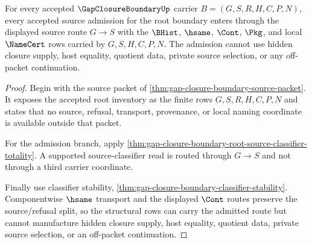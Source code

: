 \begin{theorem}
\label{thm:gap-closure-boundary-admission-route-totality}
For every accepted $\GapClosureBoundaryUp$ carrier $B=(G,S,R,H,C,P,N)$, every accepted source admission for the root boundary enters through the displayed source route $G \longrightarrow S$ with the $\BHist$, $\hsame$, $\Cont$, $\Pkg$, and local $\NameCert$ rows carried by $G,S,H,C,P,N$. The admission cannot use hidden closure supply, host equality, quotient data, private source selection, or any off-packet continuation.
\end{theorem}
\begin{proof}
Begin with the source packet of \autoref{thm:gap-closure-boundary-source-packet}. It exposes the accepted root inventory as the finite rows $G,S,R,H,C,P,N$ and states that no source, refusal, transport, provenance, or local naming coordinate is available outside that packet.

For the admission branch, apply \autoref{thm:gap-closure-boundary-root-source-classifier-totality}. A supported source-classifier read is routed through $G \longrightarrow S$ and not through a third carrier coordinate.

Finally use classifier stability, \autoref{thm:gap-closure-boundary-classifier-stability}. Componentwise $\hsame$ transport and the displayed $\Cont$ routes preserve the source/refusal split, so the structural rows can carry the admitted route but cannot manufacture hidden closure supply, host equality, quotient data, private source selection, or an off-packet continuation.
\end{proof}

